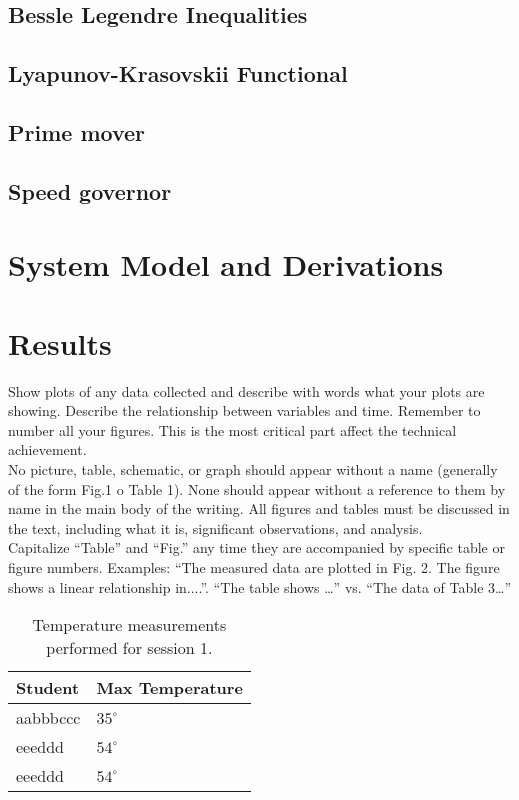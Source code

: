 \documentclass[journal]{IEEEtran}
\begin{document}
\subsection{Bessle Legendre Inequalities}
\subsection{Lyapunov-Krasovskii Functional}
\subsection{Prime mover}
\subsection{Speed governor}
\section{System Model and Derivations}
\section{Results}
Show plots of any data collected and describe with words what your plots are showing. Describe the relationship between variables and time. Remember to number all your figures.  This is the most critical part affect the technical achievement.\\
No picture, table, schematic, or graph should appear without a name (generally of the form Fig.1 o Table 1). %
None should appear without a reference to them by name in the main body of the writing.
All figures and tables must be discussed in the text, including what it is, significant observations, and analysis. \\
Capitalize “Table” and “Fig.” any time they are accompanied by specific table or figure numbers. Examples: “The measured data are plotted in Fig. 2. The figure shows a linear relationship in....”. “The table shows …” vs. “The data of Table 3…” \\

\begin{table}[!ht] %
\centering
\label{table:Exps}
\begin{tabular}{ll}
Student &  Max Temperature \\ \hline
aabbbccc &  $35^{\circ}$   \\
eeeddd &   $54^{\circ}$ \\
eeeddd &   $54^{\circ}$ \\
\end{tabular}
\caption{Temperature measurements performed for session 1.}
\end{table}
\end{document}
